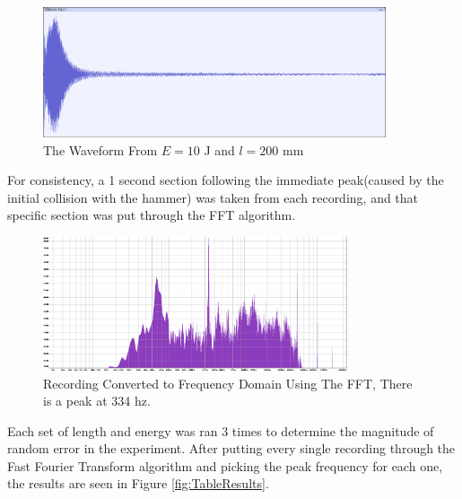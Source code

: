 \documentclass[a4paper,12pt]{article}
\begin{document}
    \begin{figure}[H]%
    \includegraphics[width=0.9\textwidth]{Recording}
    \centering
    \caption{The Waveform From $E=10$ J and $l=200$ mm}\label{fig:recPic}
    \end{figure}
    For consistency, a 1 second section following the immediate peak(caused by the initial collision with the hammer) was taken from each recording, and that specific section was put through the FFT algorithm.\\
    \begin{figure}[H]%
    \includegraphics[width=0.8\textwidth]{FFTImage}
    \centering
    \caption{Recording Converted to Frequency Domain Using The FFT, There is a peak at 334 hz.}\label{fig:FFTPic}
    \end{figure}
    Each set of length and energy was ran 3 times to determine the magnitude of random error in the experiment. After putting every single recording through the Fast Fourier Transform algorithm and picking the peak frequency for each one, the results are seen in Figure \ref{fig:TableResults}.
\end{document}
